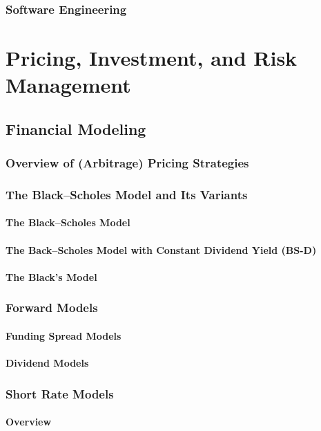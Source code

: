 \documentclass{book}
\begin{document}
\section{Software Engineering}


\part{Pricing, Investment, and Risk Management}
\chapter{Financial Modeling}
\section{Overview of (Arbitrage) Pricing Strategies}
\section{The Black--Scholes Model and Its Variants}
\subsection{The Black--Scholes Model}
\subsection{The Back--Scholes Model with Constant Dividend Yield (BS-D)}
\subsection{The Black's Model}
\section{Forward Models}
\subsection{Funding Spread Models}
\subsection{Dividend Models}
\section{Short Rate Models}
\subsection{Overview}
\end{document}
